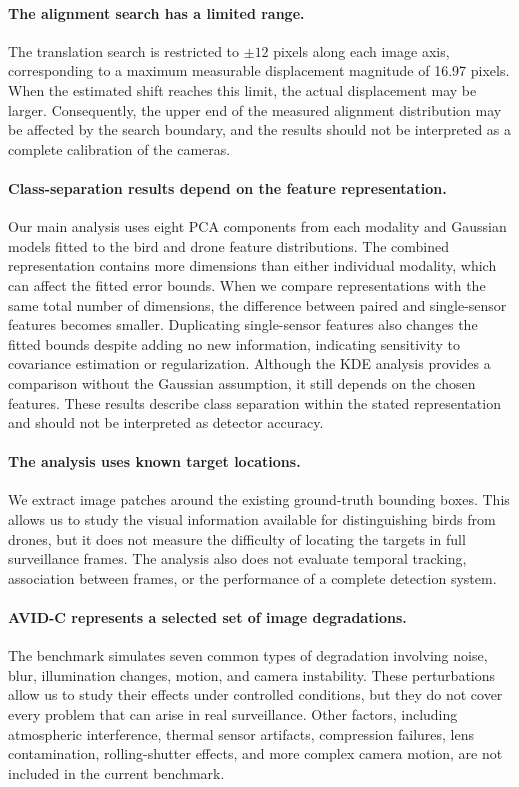 \documentclass[10pt]{article}
\newcommand{\corrupt}{\textsc{AVID-C}}
\begin{document}
\paragraph{The alignment search has a limited range.}
The translation search is restricted to $\pm12$ pixels along each image axis, corresponding to a maximum measurable displacement magnitude of 16.97 pixels. When the estimated shift reaches this limit, the actual displacement may be larger. Consequently, the upper end of the measured alignment distribution may be affected by the search boundary, and the results should not be interpreted as a complete calibration of the cameras.

\paragraph{Class-separation results depend on the feature representation.}
Our main analysis uses eight PCA components from each modality and Gaussian models fitted to the bird and drone feature distributions. The combined representation contains more dimensions than either individual modality, which can affect the fitted error bounds. When we compare representations with the same total number of dimensions, the difference between paired and single-sensor features becomes smaller. Duplicating single-sensor features also changes the fitted bounds despite adding no new information, indicating sensitivity to covariance estimation or regularization. Although the KDE analysis provides a comparison without the Gaussian assumption, it still depends on the chosen features. These results describe class separation within the stated representation and should not be interpreted as detector accuracy.

\paragraph{The analysis uses known target locations.}
We extract image patches around the existing ground-truth bounding boxes. This allows us to study the visual information available for distinguishing birds from drones, but it does not measure the difficulty of locating the targets in full surveillance frames. The analysis also does not evaluate temporal tracking, association between frames, or the performance of a complete detection system.

\paragraph{\corrupt{} represents a selected set of image degradations.}
The benchmark simulates seven common types of degradation involving noise, blur, illumination changes, motion, and camera instability. These perturbations allow us to study their effects under controlled conditions, but they do not cover every problem that can arise in real surveillance. Other factors, including atmospheric interference, thermal sensor artifacts, compression failures, lens contamination, rolling-shutter effects, and more complex camera motion, are not included in the current benchmark.
\end{document}
